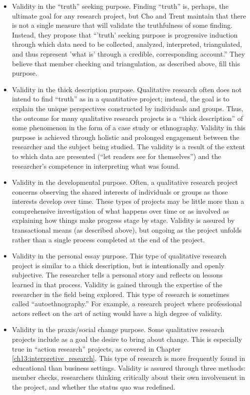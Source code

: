 \begin{itemize}
	\item Validity in the ``truth'' seeking purpose. Finding ``truth'' is, perhaps, the ultimate goal for any research project, but Cho and Trent maintain that there is not a single measure that will validate the truthfulness of some finding. Instead, they propose that ``'truth' seeking purpose is progressive induction through which data need to be collected, analyzed, interpreted, triangulated, and thus represent 'what is' through a credible, corresponding 	account.'' They believe that member checking and triangulation, as described above, fill this purpose.
	\item Validity in the thick description purpose. Qualitative research often does not intend to find ``truth'' as in a quantitative project; instead, the goal is to explain the unique perspectives constructed by individuals and groups. Thus, the outcome for many qualitative research projects is a ``thick description'' of some phenomenon in the form of a case study or ethnography. Validity in this purpose is achieved through holistic and prolonged engagement between the researcher and the subject being studied. The validity is a result of the extent to which data are presented (``let readers see for themselves'') and the researcher's competence in interpreting what was found.
	\item Validity in the developmental purpose. Often, a qualitative research project concerns observing the shared interests of individuals or groups as those interests develop over time. These types of projects may be little more than a comprehensive investigation of what happens over time or as involved as explaining how things make progress stage by stage. Validity is assured by transactional means (as described above), but ongoing as the project unfolds rather than a single process completed at the end of the project.
	\item Validity in the personal essay purpose. This type of qualitative research project is similar to a thick description, but is intentionally and openly subjective. The researcher tells a personal story and reflects on lessons learned in that process. Validity is gained through the expertise of the researcher in the field being explored. This type of research is sometimes called ``autoethnography.'' For example, a research project where professional actors reflect on the art of acting would have a high degree of validity.
	\item Validity in the praxis/social change purpose. Some qualitative research projects include as a goal the desire to bring about change. This is especially true in ``action research'' projects, as covered in Chapter \ref{ch13:interpretive_research}. This type of research is more frequently found in educational than business settings. Validity is assured through three methods: member checks, researchers thinking critically about their own involvement in the project, and whether the status quo was redefined.
\end{itemize}

